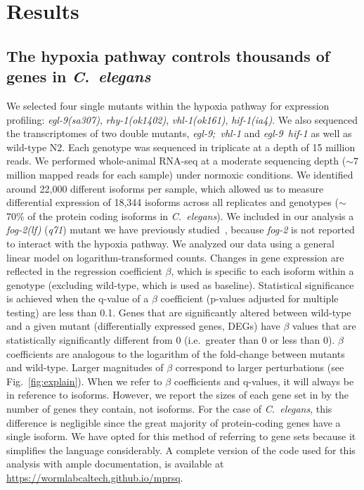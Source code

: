 \documentclass[9pt,twocolumn,twoside,lineno]{pnas-new}
\newcommand{\cel}{\emph{C.~elegans}}
\newcommand{\gene}[1]{\mbox{\emph{#1}}}
\newcommand{\fog}{\gene{fog-2(lf)}}
\begin{document}
\section*{Results}
\subsection*{The hypoxia pathway controls thousands of genes in \cel{}}
\label{sub:summary}

We selected four single mutants within the hypoxia pathway for expression
profiling: \gene{egl-9}\emph{(sa307)}, \gene{rhy-1}\emph{(ok1402)},
\gene{vhl-1}\emph{(ok161)}, \gene{hif-1}\emph{(ia4)}. We also sequenced the
transcriptomes of two double mutants, \gene{egl-9; vhl-1} and \gene{egl-9 hif-1}
as well as wild-type N2. Each genotype  was sequenced in triplicate at a depth
of 15 million reads. We performed whole-animal RNA-seq at a moderate sequencing
depth ($\sim7$ million mapped reads for each sample) under normoxic conditions.
We identified around 22,000 different isoforms per sample, which allowed us to
measure differential expression of 18,344 isoforms across all replicates and
genotypes ($\sim$70\% of the protein coding isoforms in \cel{}). We included in
our analysis a \fog{} (\emph{q71}) mutant we have previously
studied~\cite{Angeles-Albores2016a}, because \gene{fog-2} is not reported to
interact with the hypoxia pathway. We analyzed our data using a general linear
model on logarithm-transformed counts. Changes in gene expression are reflected
in the regression coefficient $\beta$, which is specific to each isoform within
a genotype (excluding wild-type, which is used as baseline). Statistical
significance is achieved when the q-value of a $\beta$ coefficient (p-values
adjusted for multiple testing) are less than 0.1. Genes that are significantly
altered between wild-type and a given mutant (differentially expressed genes,
DEGs) have $\beta$ values that are statistically significantly different from 0
(i.e.\ greater than 0 or less than 0). $\beta$ coefficients are analogous to the
logarithm of the fold-change between mutants and wild-type. Larger magnitudes of
$\beta$ correspond to larger perturbations (see Fig.~\ref{fig:explain}). When we
refer to $\beta$ coefficients and q-values, it will always be in reference to
isoforms. However, we report the sizes of each gene set in by the number of
genes they contain, not isoforms. For the case of \cel{}, this difference is
negligible since the great majority of protein-coding genes have a single
isoform. We have opted for this method of referring to gene sets because it
simplifies the language considerably. A complete version of the code used for
this analysis with ample documentation, is available at
\url{https://wormlabcaltech.github.io/mprsq}.
\end{document}
